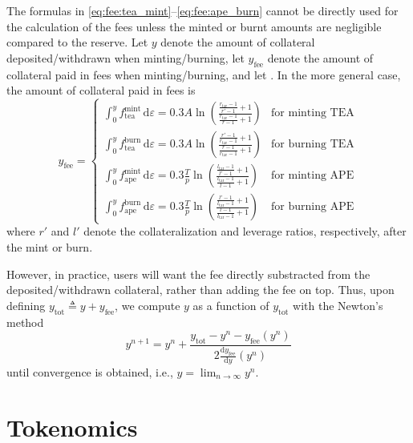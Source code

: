 \documentclass[journal,letterpaper,oneside,onecolumn,12pt]{IEEEtran}
\begin{document}
	The formulas in \eqref{eq:fee:tea_mint}--\eqref{eq:fee:ape_burn} cannot be directly used for the calculation of the fees unless the minted or burnt amounts are negligible compared to the reserve. Let $y$ denote the amount of collateral deposited/withdrawn when minting/burning, let $y_\textrm{fee}$ denote the amount of collateral paid in fees when minting/burning, and let . In the more general case, the amount of collateral paid in fees is
	\begin{equation}
		y_\textrm{fee} = 
		\begin{cases}
			\int_{0}^{y} f_\textrm{tea}^\textrm{mint} \,\mathrm{d}\varepsilon = 0.3A \ln\left(\frac{\frac{r_\textrm{tar}-1}{r'-1} +1}{\frac{r_\textrm{tar}-1}{r-1}+1}\right)	& \text{for minting TEA} \\
			\int_{0}^{y} f_\textrm{tea}^\textrm{burn} \,\mathrm{d}\varepsilon = 0.3A \ln\left(\frac{\frac{r'-1}{r_\textrm{tar}-1}+1}{\frac{r-1}{r_\textrm{tar}-1} +1}\right)	& \text{for burning TEA} \\
			\int_{0}^{y} f_\textrm{ape}^\textrm{mint} \,\mathrm{d}\varepsilon = 0.3\frac{T}{p} \ln\left(\frac{\frac{l_\textrm{tar}-1}{l'-1} +1}{\frac{l_\textrm{tar}-1}{l-1}+1}\right)	& \text{for minting APE} \\
			\int_{0}^{y} f_\textrm{ape}^\textrm{burn} \,\mathrm{d}\varepsilon = 0.3\frac{T}{p} \ln\left(\frac{\frac{l'-1}{l_\textrm{tar}-1}+1}{\frac{l-1}{l_\textrm{tar}-1} +1}\right)	& \text{for burning APE}
		\end{cases}
	\end{equation}
	where $r'$ and $l'$ denote the collateralization and leverage ratios, respectively, after the mint or burn. 
	
	However, in practice, users will want the fee directly substracted from the deposited/withdrawn collateral, rather than adding the fee on top. Thus, upon defining $y_\textrm{tot} \triangleq y+y_\textrm{fee}$, we compute $y$ as a function of $y_\textrm{tot}$ with the Newton's method
	\begin{equation}
		y^{n+1} = y^{n} +\frac{y_\textrm{tot} -y^{n} - y_\textrm{fee}(y^{n})}{2 \frac{\mathrm{d}y_\textrm{fee}}{\mathrm{d}y}(y^{n})}
	\end{equation}
	until convergence is obtained, i.e., $y=\lim_{n\rightarrow\infty}y^{n}$.
	 
	
	

	
	
	
	\section{Tokenomics}
	
\end{document}
